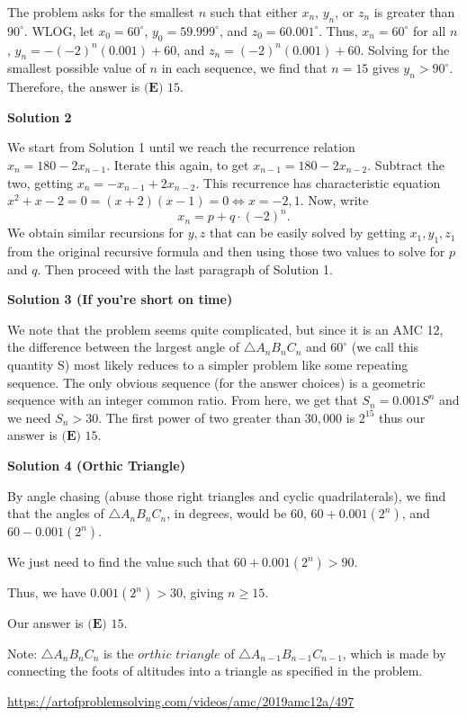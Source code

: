 \begin{enumerate}
 The problem asks for the smallest $n$ such that either $x_n$, $y_n$, or $z_n$ is greater than $90^\circ$. WLOG, let $x_0=60^\circ$, $y_0=59.999^\circ$, and $z_0=60.001^\circ$. Thus, $x_n=60^\circ$ for all $n$, $y_n=-(-2)^n(0.001)+60$, and $z_n=(-2)^n(0.001)+60$. Solving for the smallest possible value of $n$ in each sequence, we find that $n=15$ gives $y_n>90^\circ$. Therefore, the answer is $\boxed{\textbf{(E) } 15}$.

 



\textbf{Solution 2}

We start from Solution 1 until we reach the recurrence relation $x_n = 180 - 2x_{n - 1}.$ Iterate this again, to get $x_{n - 1} = 180 - 2x_{n - 2}.$ Subtract the two, getting $x_{n} = -x_{n - 1} + 2x_{n - 2}.$ This recurrence has characteristic equation $x^2 + x - 2 = 0 = (x + 2)(x - 1) = 0 \iff x = -2, 1.$ Now, write 
 \[x_n = p + q \cdot (-2)^n.\] We obtain similar recursions for $y, z$ that can be easily solved by getting $x_1, y_1, z_1$ from the original recursive formula and then using those two values to solve for $p$ and $q.$ Then proceed with the last paragraph of Solution 1.

 



\textbf{Solution 3 (If you're short on time)}

We note that the problem seems quite complicated, but since it is an AMC 12, the difference between the largest angle of $\triangle A_nB_nC_n$ and $60^{\circ}$ (we call this quantity S) most likely reduces to a simpler problem like some repeating sequence. The only obvious sequence (for the answer choices) is a geometric sequence with an integer common ratio. From here, we get that $S_n=0.001S^n$ and we need $S_n>30$. The first power of two greater than $30,000$ is $2^{15}$ thus our answer is $\boxed{\textbf{(E) } 15}$.

 


 



\textbf{Solution 4 (Orthic Triangle)}

By angle chasing (abuse those right triangles and cyclic quadrilaterals), we find that the angles of $\triangle A_nB_nC_n$, in degrees, would be $60$, $60 + 0.001(2^n)$, and $60 - 0.001(2^n)$.

 
We just need to find the value such that $60 + 0.001(2^n) > 90$.

 Thus, we have $0.001(2^n) > 30$, giving $n\geq15$. 

 Our answer is $\boxed{\textbf{(E) } 15}$.

 
Note: $\triangle A_nB_nC_n$ is the $orthic$ $triangle$ of $\triangle A_{n-1}B_{n-1}C_{n-1}$, which is made by connecting the foots of altitudes into a triangle as specified in the problem.

 


 \href{https://artofproblemsolving.com/videos/amc/2019amc12a/497}{https://artofproblemsolving.com/videos/amc/2019amc12a/497}

 


\end{enumerate}